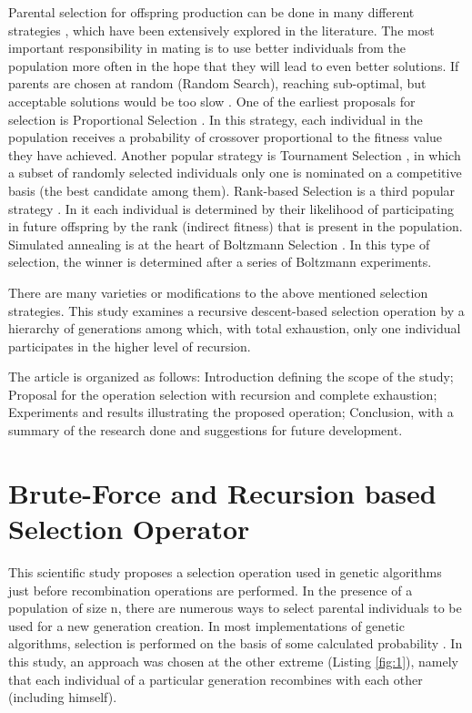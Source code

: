 \documentclass[graybox]{styles/svmult}
\begin{document}
Parental selection for offspring production can be done in many different strategies \cite{balabanov-05}, which have been extensively explored in the literature. The most important responsibility in mating is to use better individuals from the population more often in the hope that they will lead to even better solutions. If parents are chosen at random (Random Search), reaching sub-optimal, but acceptable solutions would be too slow \cite{wang-01}. One of the earliest proposals for selection is Proportional Selection \cite{back-01}. In this strategy, each individual in the population receives a probability of crossover proportional to the fitness value they have achieved. Another popular strategy is Tournament Selection \cite{miller-01}, in which a subset of randomly selected individuals only one is nominated on a competitive basis (the best candidate among them). Rank-based Selection is a third popular strategy \cite{grefenstette-01}. In it each individual is determined by their likelihood of participating in future offspring by the rank (indirect fitness) that is present in the population. Simulated annealing is at the heart of Boltzmann Selection \cite{goldberg-01}. In this type of selection, the winner is determined after a series of Boltzmann experiments.

There are many varieties or modifications to the above mentioned selection strategies. This study examines a recursive descent-based selection operation \cite{gelfand-01} by a hierarchy of generations among which, with total exhaustion, \cite{fellows-01} only one individual participates in the higher level of recursion.

The article is organized as follows: Introduction defining the scope of the study; Proposal for the operation selection with recursion and complete exhaustion; Experiments and results illustrating the proposed operation; Conclusion, with a summary of the research done and suggestions for future development.

\section{Brute-Force and Recursion based Selection Operator}
\label{sec:2}

This scientific study proposes a selection operation used in genetic algorithms just before recombination operations are performed. In the presence of a population of size n, there are numerous ways to select parental individuals to be used for a new generation creation. In most implementations of genetic algorithms, selection is performed on the basis of some calculated probability \cite{matsui-01}. In this study, an approach was chosen at the other extreme (Listing \ref{fig:1}), namely that each individual of a particular generation recombines with each other (including himself).
\end{document}
